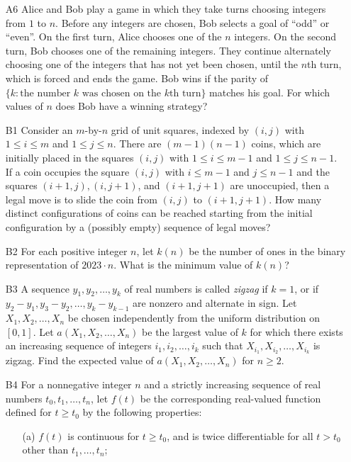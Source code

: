 \documentclass[amssymb,twocolumn,pra,10pt,aps,nofootinbib]{revtex4-1}
\begin{document}
\begin{itemize}
    \item[A6] Alice and Bob play a game in which they take turns choosing integers from $1$ to $n$. Before any integers are chosen, Bob selects a goal of ``odd'' or ``even''. On the first turn, Alice chooses one of the $n$ integers. On the second turn, Bob chooses one of the remaining integers. They continue alternately choosing one of the integers that has not yet been chosen, until the $n$th turn, which is forced and ends the game. Bob wins if the parity of $\{k\colon \mbox{the number $k$ was chosen on the $k$th turn}\}$ matches his goal. For which values of $n$ does Bob have a winning strategy?

    \item[B1] Consider an $m$-by-$n$ grid of unit squares, indexed by $(i,j)$ with $1 \leq i \leq m$ and $1 \leq j \leq n$. There are $(m-1)(n-1)$ coins, which are initially placed in the squares $(i,j)$ with $1 \leq i \leq m-1$ and $1 \leq j \leq n-1$. If a coin occupies the square $(i,j)$ with $i \leq m-1$ and $j \leq n-1$ and the squares $(i+1,j), (i,j+1)$, and $(i+1,j+1)$ are unoccupied, then a legal move is to slide the coin from $(i,j)$ to $(i+1,j+1)$. How many distinct configurations of coins can be reached starting from the initial configuration by a (possibly empty) sequence of legal moves?

    \item[B2] For each positive integer $n$, let $k(n)$ be the number of ones in the binary representation of $2023 \cdot n$. What is the minimum value of $k(n)$?

    \item[B3] A sequence $y_1,y_2,\dots,y_k$ of real numbers is called \emph{zigzag} if $k=1$, or if $y_2-y_1, y_3-y_2, \dots, y_k-y_{k-1}$ are nonzero and alternate in sign. Let $X_1,X_2,\dots,X_n$ be chosen independently from the uniform distribution on $[0,1]$. Let $a(X_1,X_2,\dots,X_n)$ be the largest value of $k$ for which there exists an increasing sequence of integers $i_1,i_2,\dots,i_k$ such that $X_{i_1},X_{i_2},\dots,X_{i_k}$ is zigzag. Find the expected value of $a(X_1,X_2,\dots,X_n)$ for $n \geq 2$.

    \item[B4] For a nonnegative integer $n$ and a strictly increasing sequence of real numbers $t_0,t_1,\dots,t_n$, let $f(t)$ be the corresponding real-valued function defined for $t \geq t_0$ by the following properties: 
    \begin{enumerate}


    \item[(a)] $f(t)$ is continuous for $t \geq t_0$, and is twice differentiable for all $t>t_0$ other than $t_1,\dots,t_n$;


\end{enumerate}
\end{itemize}
\end{document}
